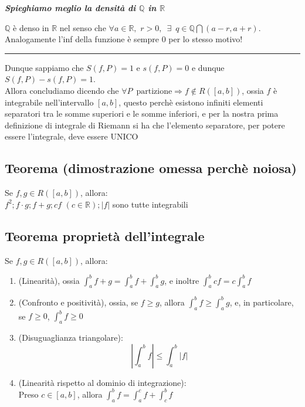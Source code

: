 \documentclass{article}
\theoremstyle{definition}
\newcommand{\R}{\mathbb{R}}
\begin{document}
\begin{center}
    \textbf{\textit{Spieghiamo meglio la densità di $\mathbb{Q}$ in $\R$}}
\end{center}
$\mathbb{Q}$ è denso in $\R$ nel senso che $\forall a \in \R, \,\, r > 0, \,\,\, \exists \,\,\, q \in \mathbb{Q} \bigcap (a-r,a+r)$.
\\
Analogamente l'inf della funzione è sempre 0 per lo stesso motivo!
    \vspace{15pt}
    \hrule
    \vspace{15pt}
Dunque sappiamo che $S(f,P)=1$ e $s(f,P)=0$ e dunque $S(f,P)-s(f,P)=1$.
\\
Allora concludiamo dicendo che $\forall P \,\,\, \mbox{partizione} \Longrightarrow f \notin R([a,b])$, ossia $f$ è integrabile nell'intervallo $[a,b]$, questo perchè esistono infiniti elementi separatori tra le somme superiori e le somme inferiori, e per la nostra prima definizione di integrale di Riemann si ha che l'elemento separatore, per potere essere l'integrale, deve essere UNICO
\\
\subsection{Teorema (dimostrazione omessa perchè noiosa)}
Se $f,g \in R([a,b])$, allora:
\\
$f^2; f \cdot g ; f+g ; cf \,\, (c \in \R) ; \left|f\right| $ sono tutte integrabili

\subsection{Teorema proprietà dell'integrale}
Se $f,g \in R([a,b])$, allora:
\begin{enumerate}
    \item (Linearità), ossia $\int_{a}^b f+g=\int_a^b f + \int_a^b g$, e inoltre $\int_a^b cf= c\int_a^b f$
    \item (Confronto e positività), ossia, se $f \geqslant g$, allora $\int_a^b f \geqslant \int_a^b g$, e, in particolare, se $f \geqslant 0$, $\int_a^b f \geqslant 0$
    \item (Disuguaglianza triangolare):
    \begin{equation*}
        \left|\int_a^b f\right| \leqslant \int_a^b\left|f\right|
    \end{equation*}
    \item (Linearità rispetto al dominio di integrazione):
    \\
    Preso $c \in [a,b]$, allora $\int_a^b f= \int_a^c f + \int_c^b f$
\end{enumerate}
\end{document}
